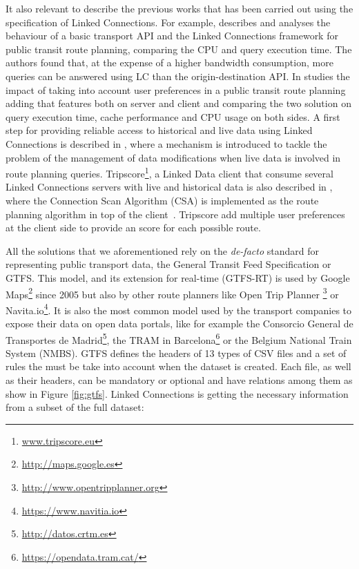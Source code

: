 \documentclass[sw]{iosart2x}
\begin{document}
	It also relevant to describe the previous works that has been carried out using the specification of Linked Connections. For example, \cite{colpaert2017public} describes and analyses the behaviour of a basic transport API and the Linked Connections framework for public transit route planning, comparing the CPU and query execution time. The authors found that, at the expense of a higher bandwidth consumption, more queries can be answered using LC than the origin-destination API. In \cite{colpaert2016impact} studies the impact of taking into account user preferences in a public transit route planning adding that features both on server and client and comparing the two solution on query execution time, cache performance and CPU usage on both sides. A first step for providing reliable access to historical and live data using Linked Connections is described in \cite{rojas2017providing}, where a mechanism is introduced to tackle the problem of the management of data modifications when live data is involved in route planning queries. Tripscore\footnote{\url{www.tripscore.eu}}, a Linked Data client that consume several Linked Connections servers with live and historical data is also described in \cite{ChavesFragaEtAl:DeSemWeb2017}, where the Connection Scan Algorithm (CSA) is implemented as the route planning algorithm in top of the client~\cite{dibbelt2013intriguingly}. Tripscore add multiple user preferences at the client side to provide an score for each possible route. 
	
	All the solutions that we aforementioned rely on the \textit{de-facto} standard for representing public transport data, the General Transit Feed Specification or GTFS. This model, and its extension for real-time (GTFS-RT) is used by Google Maps\footnote{\url{http://maps.google.es}} since 2005 but also by other route planners like Open Trip Planner \footnote{\url{http://www.opentripplanner.org}} or  Navita.io\footnote{\url{https://www.navitia.io}}. It is also the most common model used by the transport companies to expose their data on open data portals, like for example the Consorcio General de Transportes de Madrid\footnote{\url{http://datos.crtm.es}}, the TRAM in Barcelona\footnote{\url{https://opendata.tram.cat/}} or the Belgium National Train System (NMBS). GTFS defines the headers of 13 types of CSV files and a set of rules the must be take into account when the dataset is created. Each file, as well as their headers, can be mandatory or optional and have relations among them as show in Figure \ref{fig:gtfs}. Linked Connections is getting the necessary information from a subset of the full dataset:
	
\end{document}
